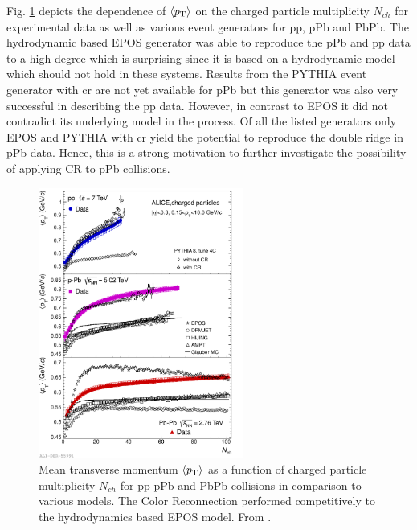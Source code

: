 Fig. \ref{fig:cf_comparison} depicts the dependence of $\left< \pt \right>$ on the charged particle multiplicity $N_{ch}$ for experimental data as well as various event generators for \gls{pp}, \gls{pPb} and \gls{PbPb}. The hydrodynamic based EPOS generator was able to reproduce the \gls{pPb} and \gls{pp} data to a high degree which is surprising since it is based on a hydrodynamic model which should not hold in these systems. Results from the PYTHIA event generator with \gls{cr} are not yet available for \gls{pPb} but this generator was also very successful in describing the \gls{pp} data. However, in contrast to EPOS it did not contradict its underlying model in the process. Of all the listed generators only EPOS and PYTHIA with \gls{cr} yield the potential to reproduce the double ridge in \gls{pPb} data. Hence, this is a strong motivation to further investigate the possibility of applying CR to \gls{pPb} collisions.

\begin{figure}
  \centering
  \includegraphics[width=0.6\textwidth]{figures/cr_comparisons.pdf}
  \caption[Mean transverse momentum $\left< \pt \right>$ as a function of charged particle multiplicity $N_{ch}$ for \gls{pp} \gls{pPb} and \gls{PbPb} collisions in comparison to various models.]{Mean transverse momentum $\left< \pt \right>$ as a function of charged particle multiplicity $N_{ch}$ for \gls{pp} \gls{pPb} and \gls{PbPb} collisions in comparison to various models. The Color Reconnection performed competitively to the hydrodynamics based EPOS model. From \cite{cr_epos}.}
  \label{fig:cf_comparison}
\end{figure}


